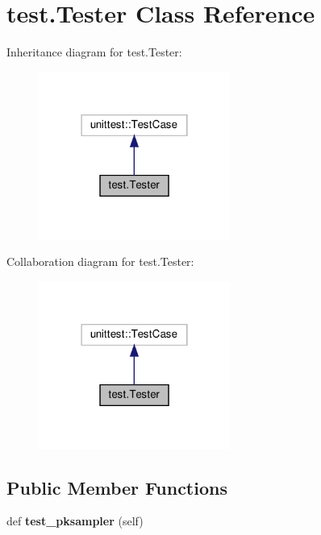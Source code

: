 \hypertarget{classtest_1_1Tester}{}\section{test.\+Tester Class Reference}
\label{classtest_1_1Tester}


Inheritance diagram for test.\+Tester\+:
\nopagebreak
\begin{figure}[H]
\begin{center}
\leavevmode
\includegraphics[width=178pt]{classtest_1_1Tester__inherit__graph}
\end{center}
\end{figure}


Collaboration diagram for test.\+Tester\+:
\nopagebreak
\begin{figure}[H]
\begin{center}
\leavevmode
\includegraphics[width=178pt]{classtest_1_1Tester__coll__graph}
\end{center}
\end{figure}
\subsection*{Public Member Functions}
\begin{DoxyCompactItemize}
\item 
\mbox{\label{classtest_1_1Tester_acf998a6a07a792f3d2a58ffa03a91ea2}} 
def {\bfseries test\+\_\+pksampler} (self)
\end{DoxyCompactItemize}


